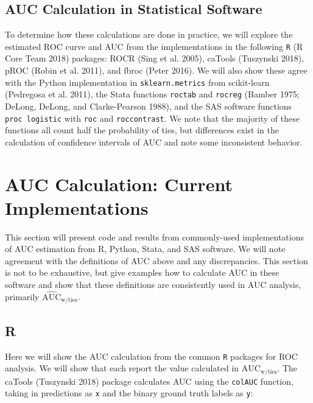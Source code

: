 \documentclass[smallextended]{svjour3}       %
\begin{document}
\hypertarget{auc-calculation-in-statistical-software}{%
\subsection{AUC Calculation in Statistical
Software}\label{auc-calculation-in-statistical-software}}

To determine how these calculations are done in practice, we will
explore the estimated ROC curve and AUC from the implementations in the
following \texttt{R} (R Core Team 2018) packages:
{\selectfont ROCR} (Sing et al. 2005),
{\selectfont caTools} (Tuszynski 2018),
{\selectfont pROC} (Robin et al. 2011), and
{\selectfont fbroc} (Peter 2016). We will also show these
agree with the Python implementation in \texttt{sklearn.metrics} from
{\selectfont scikit-learn} (Pedregosa et al. 2011), the
Stata functions \texttt{roctab} and \texttt{rocreg} (Bamber 1975;
DeLong, DeLong, and Clarke-Pearson 1988), and the SAS software functions
\texttt{proc\ logistic} with \texttt{roc} and \texttt{roccontrast}. We
note that the majority of these functions all count half the probability
of ties, but differences exist in the calculation of confidence
intervals of AUC and note some inconsistent behavior.

\hypertarget{auc-calculation-current-implementations}{%
\section{AUC Calculation: Current
Implementations}\label{auc-calculation-current-implementations}}

This section will present code and results from commonly-used
implementations of AUC estimation from R, Python, Stata, and SAS
software. We will note agreement with the definitions of AUC above and
any discrepancies. This section is not to be exhaustive, but give
examples how to calculate AUC in these software and show that these
definitions are consistently used in AUC analysis, primarily
\(\widehat{\text{AUC}}_{\text{w/ties}}\).

\hypertarget{r}{%
\subsection{R}\label{r}}

Here we will show the AUC calculation from the common \texttt{R}
packages for ROC analysis. We will show that each report the value
calculated in \(\text{AUC}_{\text{w/ties}}\). The
{\selectfont caTools} (Tuszynski 2018) package calculates
AUC using the \texttt{colAUC} function, taking in predictions as
\texttt{x} and the binary ground truth labels as \texttt{y}:
\end{document}
